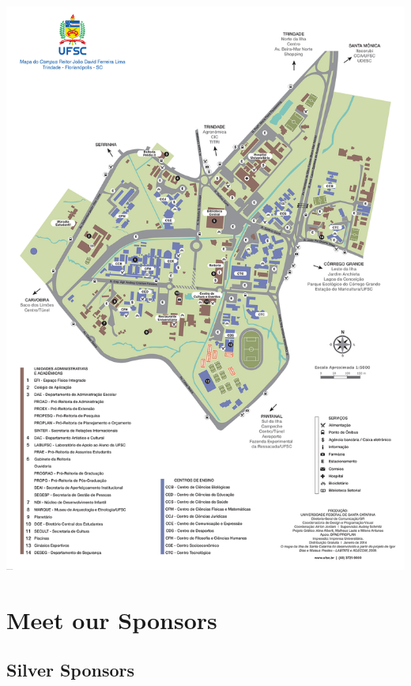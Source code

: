 \documentclass[12pt]{article}
\begin{document}
\thispagestyle{empty}
\noindent  %
\includegraphics[width=\textwidth]{../../media/img/mapa_UFSC_2014_1500x2121}

\clearpage

\restoregeometry



\newpage

\section*{Meet our Sponsors}
\subsection*{Silver Sponsors}
\begin{minipage}{0.45\textwidth}

\end{minipage}
\hfill
\begin{minipage}{0.45\textwidth}

\end{minipage}
\end{document}
